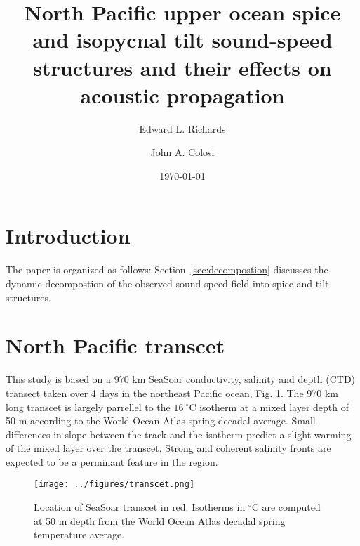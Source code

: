 \documentclass[preprint,NumberedRefs]{JASA}
\begin{document}
\title[Mixed layer tilt and spice]{North Pacific upper ocean spice and isopycnal tilt sound-speed structures and their effects on acoustic propagation}
\author{Edward L. Richards}
\author{John A. Colosi}


\date{\today}


\begin{abstract}

\end{abstract}

\maketitle

\section{\label{sec:intro} Introduction}

The paper is organized as follows: Section~\ref{sec:decompostion} discusses the dynamic decompostion of the observed sound speed field into spice and tilt structures.

\section{North Pacific transcet}
This study is based on a 970 km SeaSoar conductivity, salinity and depth (CTD) transect taken over 4 days in the northeast Pacific ocean\citep{cole2010seasonal}, Fig. \ref{fig:transcet}. The 970 km long transcet is largely parrellel to the $16 \ ^\circ$C isotherm at a mixed layer depth of 50 m according to the World Ocean Atlas spring decadal average. Small differences in slope between the track and the isotherm predict a slight warming of the mixed layer over the transcet. Strong and coherent salinity fronts are expected to be a perminant feature in the region.

\begin{figure}
\texttt{[image: ../figures/transcet.png]}
    \caption{\label{fig:transcet}{Location of SeaSoar transcet in red. Isotherms in $^\circ$C are computed at 50 m depth from the World Ocean Atlas decadal spring temperature average.}}
\end{figure}
\end{document}
